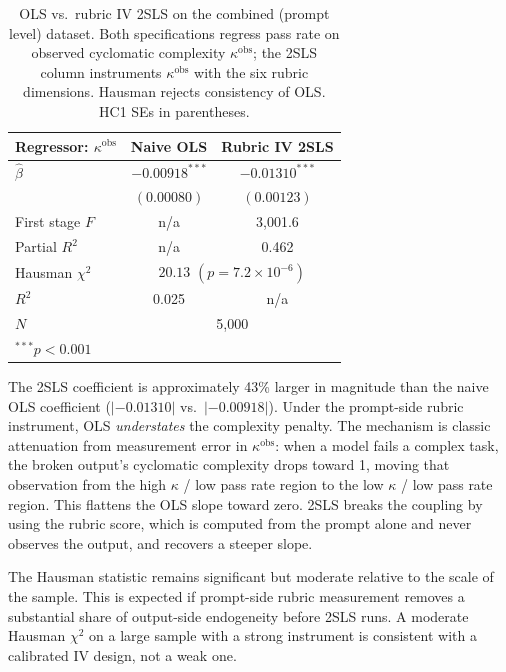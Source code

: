 \documentclass{article}
\begin{document}
\begin{table}[h]
\centering
\caption{OLS vs.\ rubric IV 2SLS on the combined (prompt level) dataset. Both specifications regress pass rate on observed cyclomatic complexity $\kappa^{\text{obs}}$; the 2SLS column instruments $\kappa^{\text{obs}}$ with the six rubric dimensions. Hausman rejects consistency of OLS. HC1 SEs in parentheses.}
\label{tab:ols-vs-2sls}
\begin{tabular}{@{}lcc@{}}
\toprule
Regressor: $\kappa^{\text{obs}}$ & Naive OLS & Rubric IV 2SLS \\
\midrule
$\hat{\beta}$               & $-0.00918^{***}$ & $-0.01310^{***}$ \\
                            & $(0.00080)$      & $(0.00123)$ \\
\midrule
First stage $F$             & n/a              & 3{,}001.6 \\
Partial $R^2$               & n/a              & 0.462 \\
Hausman $\chi^2$            & \multicolumn{2}{c}{$20.13$ $(p=7.2\times 10^{-6})$} \\
$R^2$                       & 0.025            & n/a \\
$N$                         & \multicolumn{2}{c}{5{,}000} \\
\bottomrule
\multicolumn{3}{l}{\footnotesize $^{***}p<0.001$}
\end{tabular}
\end{table}

The 2SLS coefficient is approximately 43\% larger in magnitude than the naive OLS coefficient ($|-0.01310|$ vs.\ $|-0.00918|$). Under the prompt-side rubric instrument, OLS \emph{understates} the complexity penalty. The mechanism is classic attenuation from measurement error in $\kappa^{\text{obs}}$: when a model fails a complex task, the broken output's cyclomatic complexity drops toward 1, moving that observation from the high $\kappa$ / low pass rate region to the low $\kappa$ / low pass rate region. This flattens the OLS slope toward zero. 2SLS breaks the coupling by using the rubric score, which is computed from the prompt alone and never observes the output, and recovers a steeper slope.

The Hausman statistic remains significant but moderate relative to the scale of the sample. This is expected if prompt-side rubric measurement removes a substantial share of output-side endogeneity before 2SLS runs. A moderate Hausman $\chi^2$ on a large sample with a strong instrument is consistent with a calibrated IV design, not a weak one.
\end{document}
